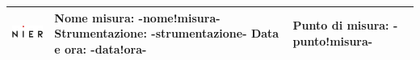 \documentclass[11pt]{article}
\begin{document}


\begin{center}

 
 \begin{tabular}{| >{\centering\arraybackslash}m{} | m{} | >{\centering\arraybackslash}m{} |}

 \hline
    \begin{minipage}{.25\textwidth}
	\centering
      \includegraphics[width=3cm, height=10mm]{-logo-.png}
    \end{minipage}   
    & \vspace{0.1cm} \textbf{Nome misura}: -nome!misura-  \newline \textbf{Strumentazione}: -strumentazione-
 \newline \textbf{Data e ora}: -data!ora- \vspace{0.1cm} &  {\large\textbf{Punto di misura: -punto!misura-}} \\
 \hline
\end{tabular}
\end{center}
\end{document}
